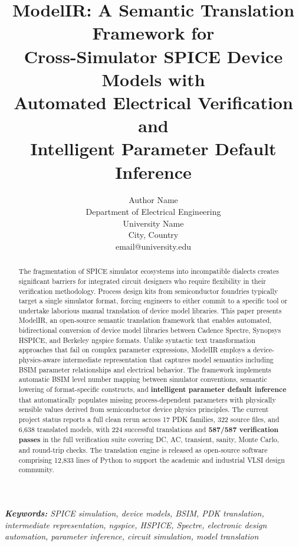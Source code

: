 \documentclass[10pt,twocolumn]{article}
\begin{document}
\title{ModelIR: A Semantic Translation Framework for \\Cross-Simulator SPICE Device Models with\\Automated Electrical Verification and \\Intelligent Parameter Default Inference}

\author{
Author Name \\
Department of Electrical Engineering \\
University Name \\
City, Country \\
email@university.edu
}

\maketitle

\textit{\textbf{Keywords:} SPICE simulation, device models, BSIM, PDK translation, intermediate representation, ngspice, HSPICE, Spectre, electronic design automation, parameter inference, circuit simulation, model translation}

\begin{abstract}
The fragmentation of SPICE simulator ecosystems into incompatible dialects creates significant barriers for integrated circuit designers who require flexibility in their verification methodology. Process design kits from semiconductor foundries typically target a single simulator format, forcing engineers to either commit to a specific tool or undertake laborious manual translation of device model libraries. This paper presents ModelIR, an open-source semantic translation framework that enables automated, bidirectional conversion of device model libraries between Cadence Spectre, Synopsys HSPICE, and Berkeley ngspice formats. Unlike syntactic text transformation approaches that fail on complex parameter expressions, ModelIR employs a device-physics-aware intermediate representation that captures model semantics including BSIM parameter relationships and electrical behavior. The framework implements automatic BSIM level number mapping between simulator conventions, semantic lowering of format-specific constructs, and \textbf{intelligent parameter default inference} that automatically populates missing process-dependent parameters with physically sensible values derived from semiconductor device physics principles. The current project status reports a full clean rerun across 17 PDK families, 322 source files, and 6,638 translated models, with 224 successful translations and \textbf{587/587 verification passes} in the full verification suite covering DC, AC, transient, sanity, Monte Carlo, and round-trip checks. The translation engine is released as open-source software comprising 12,833 lines of Python to support the academic and industrial VLSI design community.
\end{abstract}
\end{document}
